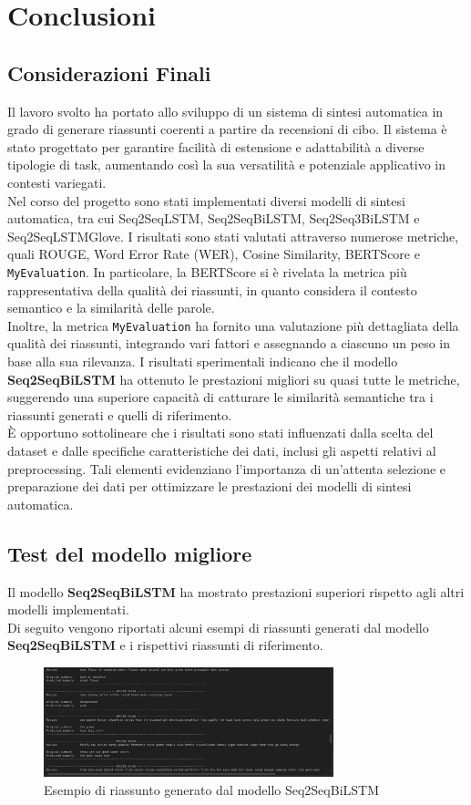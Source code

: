 \section{Conclusioni} 
\subsection{Considerazioni Finali}
Il lavoro svolto ha portato allo sviluppo di un sistema di sintesi automatica in grado di generare riassunti coerenti a partire da recensioni di cibo. Il sistema è stato progettato per garantire facilità di estensione e adattabilità a diverse tipologie di task, aumentando così la sua versatilità e potenziale applicativo in contesti variegati.\\
Nel corso del progetto sono stati implementati diversi modelli di sintesi automatica, tra cui Seq2SeqLSTM, Seq2SeqBiLSTM, Seq2Seq3BiLSTM e Seq2SeqLSTMGlove. 
I risultati sono stati valutati attraverso numerose metriche, quali ROUGE, Word Error Rate (WER), Cosine Similarity, BERTScore e \texttt{MyEvaluation}. In particolare, 
la BERTScore si è rivelata la metrica più rappresentativa della qualità dei riassunti, in quanto considera il contesto semantico e la similarità delle parole.\\

Inoltre, la metrica \texttt{MyEvaluation} ha fornito una valutazione più dettagliata della qualità dei riassunti, integrando vari fattori e assegnando a ciascuno 
un peso in base alla sua rilevanza. I risultati sperimentali indicano che il modello \textbf{Seq2SeqBiLSTM} ha ottenuto le prestazioni migliori su quasi tutte le metriche, 
suggerendo una superiore capacità di catturare le similarità semantiche tra i riassunti generati e quelli di riferimento.\\

È opportuno sottolineare che i risultati sono stati influenzati dalla scelta del dataset e dalle specifiche caratteristiche dei dati, 
inclusi gli aspetti relativi al preprocessing. Tali elementi evidenziano l'importanza di un'attenta selezione e preparazione dei dati per 
ottimizzare le prestazioni dei modelli di sintesi automatica.

\subsection{Test del modello migliore}
Il modello \textbf{Seq2SeqBiLSTM} ha mostrato prestazioni superiori rispetto agli altri modelli implementati.\\
Di seguito vengono riportati alcuni esempi di riassunti generati dal modello \textbf{Seq2SeqBiLSTM} e i rispettivi riassunti di riferimento.\\

\begin{figure}[H]
    \centering
    \includegraphics[width=0.75\textwidth]{media/Seq2SeqBiLSTM_inference.png}
    \caption{Esempio di riassunto generato dal modello Seq2SeqBiLSTM}
    \label{fig:example1}
\end{figure}